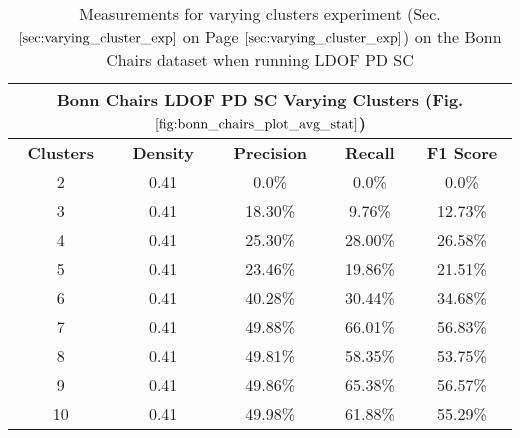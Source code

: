 \begin{table}[H]
\centering
\begin{tabular}{|c|c|c|c|c|}
\hline
\multicolumn{5}{|c|}{Bonn Chairs LDOF PD SC Varying Clusters (Fig. $\ref{fig:bonn_chairs_plot_avg_stat}$)}                        \\ \hline
\textbf{Clusters} & \textbf{Density} & \textbf{Precision} & \textbf{Recall} & \textbf{F1 Score} \\ \hline
2 & 0.41 & 0.0\%   & 0.0\%     & 0.0\%  \\ \hline
3 & 0.41 & 18.30\%   & 9.76\%     & 12.73\%  \\ \hline
4 & 0.41 & 25.30\%   & 28.00\%     & 26.58\%  \\ \hline
5 & 0.41 & 23.46\%   & 19.86\%     & 21.51\%  \\ \hline
6 & 0.41 & 40.28\%   & 30.44\%     & 34.68\%  \\ \hline
7 & 0.41 & 49.88\%   & 66.01\%     & 56.83\%  \\ \hline
8 & 0.41 & 49.81\%   & 58.35\%     & 53.75\%  \\ \hline
9 & 0.41 & 49.86\%   & 65.38\%     & 56.57\%  \\ \hline              
10 & 0.41 & 49.98\%   & 61.88\%     & 55.29\%  \\ \hline
\end{tabular}
\caption[Bonn Chairs PD SC Varying Clusters]{Measurements for varying clusters experiment (Sec. $\ref{sec:varying_cluster_exp}$ on Page $\pageref{sec:varying_cluster_exp}$) on the Bonn Chairs dataset when running LDOF PD SC}

\label{tab:bonn_chairs_ldof_sed_c_6_9_10_eval_pd_sc}
\end{table}

